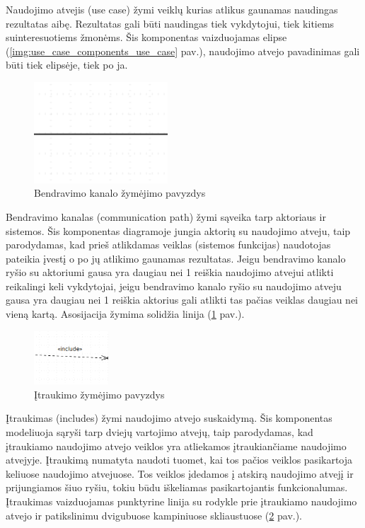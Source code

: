 Naudojimo atvejis (use case) žymi veiklų kurias atlikus gaunamas naudingas rezultatas aibę. Rezultatas gali būti naudingas tiek vykdytojui, tiek kitiems suinteresuotiems žmonėms. Šis komponentas vaizduojamas elipse (\ref{img:use_case_components_use_case} pav.),
naudojimo atvejo pavadinimas gali būti tiek elipsėje, tiek po ja.

\begin{figure}[H]
	\centering
	\includegraphics[width=5cm]{img/use_case_components/association}
	\caption{Bendravimo kanalo žymėjimo pavyzdys}
	\label{img:use_case_components_communication_path}
\end{figure}

Bendravimo kanalas (communication path) žymi sąveika tarp aktoriaus ir sistemos. Šis komponentas diagramoje jungia aktorių su naudojimo atveju, taip parodydamas, kad prieš atlikdamas veiklas (sistemos funkcijas) naudotojas pateikia įvestį o po jų atlikimo gaunamas rezultatas. Jeigu bendravimo kanalo ryšio su aktoriumi gausa yra daugiau nei 1 reiškia naudojimo atvejui atlikti reikalingi keli vykdytojai, jeigu bendravimo kanalo ryšio su naudojimo atveju gausa yra daugiau nei 1 reiškia aktorius gali atlikti tas pačias veiklas daugiau nei vieną kartą. Asosijacija žymima solidžia linija (\ref{img:use_case_components_communication_path} pav.).

\begin{figure}[H]
	\centering
	\includegraphics[height=2cm]{img/use_case_components/includes}
	\caption{Įtraukimo žymėjimo pavyzdys}
	\label{img:use_case_components_includes}
\end{figure}

Įtraukimas (includes) žymi naudojimo atvejo suskaidymą. Šis komponentas modeliuoja sąryši tarp dviejų vartojimo atvejų, taip parodydamas, kad įtraukiamo naudojimo atvejo veiklos yra atliekamos įtraukiančiame naudojimo atvejyje. Įtraukimą numatyta naudoti tuomet, kai tos pačios veiklos pasikartoja keliuose naudojimo atvejuose. Tos veiklos įdedamos į atskirą naudojimo atvejį ir prijungiamos šiuo ryšiu, tokiu būdu iškeliamas pasikartojantis funkcionalumas. Įtraukimas vaizduojamas punktyrine linija su rodykle  prie įtraukiamo naudojimo atvejo ir patikslinimu dvigubuose kampiniuose skliaustuose (\ref{img:use_case_components_includes} pav.).

